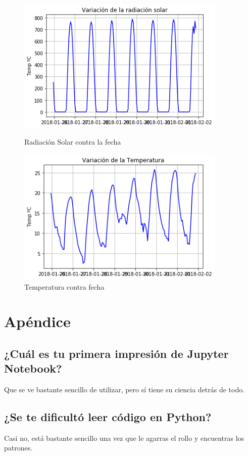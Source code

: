 \documentclass{article}
\begin{document}
 \newpage
    
    \begin{figure}
    \includegraphics[width=10cm]{RadSol contra Fecha.png}
    \caption{Radiación Solar contra la fecha}

    \includegraphics[width=10cm]{Temp contra fecha.png}
    \caption{Temperatura contra fecha}

    \end{figure}
    
\newpage

\section{Apéndice}
\subsection{¿Cuál es tu primera impresión de Jupyter Notebook?}
Que se ve bastante sencillo de utilizar, pero sí tiene su ciencia detrás de todo.
\subsection{¿Se te dificultó leer código en Python?}
Casi no, está bastante sencillo una vez que le agarras el rollo y encuentras los patrones.
\end{document}
